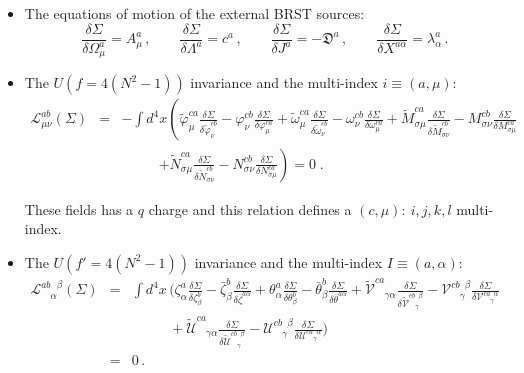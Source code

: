 \begin{appendix}
\begin{itemize}
\item{The equations of motion of the external BRST sources:}
\begin{equation}
\frac{\delta\Sigma}{\delta{\Omega^{a}_{\mu}}}=A^{a}_{\mu}\,,\qquad
\frac{\delta\Sigma}{\delta{\Lambda^{a}}}=c^{a}\,,\qquad
\frac{\delta\Sigma}{\delta{J^{a}}}=-\mathfrak{D}^{a}\,,\qquad
\frac{\delta\Sigma}{\delta{X^{a\alpha}}}=\lambda^{a}_{\alpha}\,.
\end{equation}

\item{The $U(f=4(N^2-1))$ invariance and the multi-index $i\equiv(a,\mu)$:}
\begin{eqnarray}
 \mathcal{L}^{ab}_{\mu\nu}(\Sigma) &=&- \int d^{4}x \left( 
\tilde{\varphi}^{ca}_{\mu}\frac{\delta \Sigma}{\delta \tilde{\varphi}^{cb}_{\nu}}
 - \varphi^{cb}_{\nu}\frac{\delta\Sigma}{\delta\varphi^{ca}_{\mu}} 
+\tilde{\omega}^{ca}_{\mu}\frac{\delta \Sigma}{\delta \tilde{\omega}^{cb}_{\nu}}
 - \omega^{cb}_{\nu}\frac{\delta\Sigma}{\delta\omega^{ca}_{\mu}}   
+\tilde{M}^{ca}_{\sigma\mu}\frac{\delta \Sigma}{\delta \tilde{M}^{cb}_{\sigma\nu}}
 - M^{cb}_{\sigma\nu}\frac{\delta\Sigma}{\delta{M}^{ca}_{\sigma\mu}}  
 \right. \nonumber \\
&&\phantom{\int d^{4}x\,}  \left. 
+\tilde{N}^{ca}_{\sigma\mu}\frac{\delta \Sigma}{\delta \tilde{N}^{cb}_{\sigma\nu}}
 - N^{cb}_{\sigma\nu}\frac{\delta\Sigma}{\delta{N}^{ca}_{\sigma\mu}}  
\right) = 0\;.
\end{eqnarray}

\noindent These fields has a $q$ charge and this relation defines a $(c,\mu)\!:~ i,j,k,l$ 
multi-index.

\item{The $U(f'=4(N^2-1))$ invariance and the multi-index $I\equiv(a,\alpha)$:}
\begin{eqnarray}
\mathcal{L}^{ab\phantom{\alpha}\beta}_{\phantom{ab}\alpha}(\Sigma)&=&\int d^{4}x\,\biggl(
\zeta^{a}_{\alpha}\frac{\delta\Sigma}{\delta\zeta^{b}_{\beta}}
-\bar\zeta^{b}_{\beta}\frac{\delta\Sigma}{\delta\bar\zeta^{a\alpha}}
+\theta^{a}_{\alpha}\frac{\delta\Sigma}{\delta\theta^{b}_{\beta}}
-\bar\theta^{b}_{\beta}\frac{\delta\Sigma}{\delta\bar\theta^{a\alpha}}
+\widetilde{\mathcal{V}}^{ca}_{\phantom{ca}\gamma\alpha}
\frac{\delta\Sigma}{\delta\widetilde{\mathcal{V}}^{cb\phantom{\gamma}\beta}_{\phantom{cb}\gamma}}
-{\mathcal{V}}^{cb\phantom{\gamma}\beta}_{\phantom{cb}\gamma}
\frac{\delta\Sigma}{\delta{\mathcal{V}}^{ca\phantom{\gamma}\alpha}_{\phantom{ca}\gamma}}
\nonumber\\
&&\phantom{\int d^{4}x\,}
+\widetilde{\mathcal{U}}^{ca}_{\phantom{ca}\gamma\alpha}
\frac{\delta\Sigma}{\delta\widetilde{\mathcal{U}}^{cb\phantom{\gamma}\beta}_{\phantom{cb}\gamma}}
-{\mathcal{U}}^{cb\phantom{\gamma}\beta}_{\phantom{cb}\gamma}
\frac{\delta\Sigma}{\delta{\mathcal{U}}^{ca\phantom{\gamma}\alpha}_{\phantom{ca}\gamma}}\biggr)\nonumber\\
&=&0\,.
\end{eqnarray}


\end{itemize}
\end{appendix}
